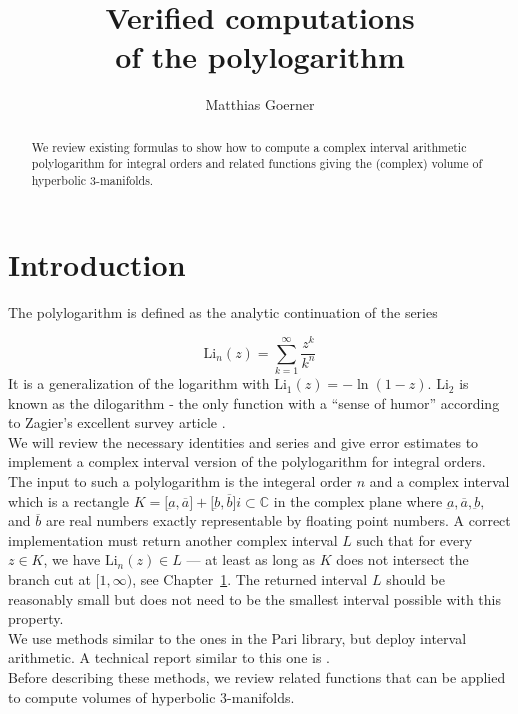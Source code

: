 \documentclass[utopia]{nmd/article}
\title{Verified computations\\ \mbox{} \hspace{5cm}  of the polylogarithm}
\author{Matthias Goerner}
\def\Li{\mathrm{Li}}
\begin{document}
\begin{abstract}
We review existing formulas to show how to compute a complex interval arithmetic polylogarithm for integral orders and related functions giving the (complex) volume of hyperbolic 3-manifolds.
\end{abstract}

\maketitle

\section{Introduction}

The polylogarithm is defined as the analytic continuation of the series

\begin{equation} \label{eqn:def}
\Li_{n}(z) = \sum_{k=1}^{\infty} \frac{z^k}{k^n}
\end{equation}
It is a generalization of the logarithm with $\Li_1(z) = -\ln(1-z)$. $\Li_2$ is known as the dilogarithm - the only function with a ``sense of humor'' according to Zagier's excellent survey article \cite{zagier:theDilogarithmFunction}.\\
We will review the necessary identities and series and give error estimates to implement a complex interval version of the polylogarithm for integral orders.\\
The input to such a polylogarithm is the integeral order $n$ and a complex interval which is a rectangle $K=\big[\underbar{a},\overline{a}\big]+\big[\underbar{b},\overline{b}\big]i\subset\mathbb{C}$
in the complex plane where $\underbar{a}, \overline{a}, \underbar{b},$ and $\overline{b}$ are real numbers exactly representable by floating point numbers. A correct implementation must return another complex interval $L$ such that for every $z\in K$, we have $\Li_n(z)\in L$ --- at least as long as $K$ does not intersect the branch cut at $[1,\infty)$, see Chapter~\ref{}. The returned interval $L$ should be reasonably small but does not need to be the smallest interval possible with this property.\\
We use methods similar to the ones in the Pari \cite{pari} library, but deploy interval arithmetic. A technical report similar to this one is \cite{wood92}.\\
Before describing these methods, we review related functions that can be applied to compute volumes of hyperbolic 3-manifolds.
\end{document}
